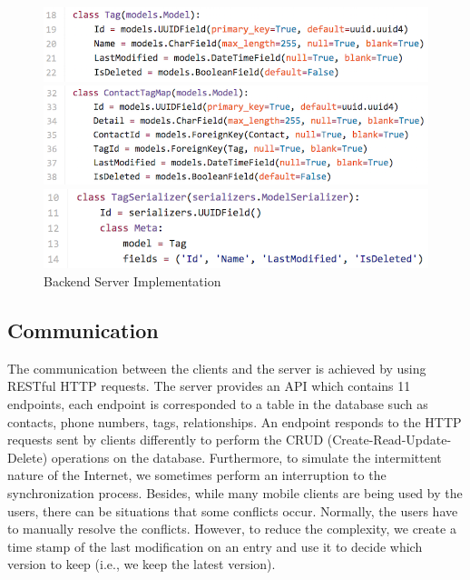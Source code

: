 \begin{figure}[!h]
\begin{centering}
\includegraphics[scale=0.5]{pics/django_tag.png}

\vspace{0.5cm}

\includegraphics[scale=0.5]{pics/django_tagmap.png}

\vspace{0.5cm}

\includegraphics[scale=0.46]{pics/django_serializer.png}
\caption{Backend Server Implementation}\label{fg:server_implementation}
\end{centering}
\end{figure}


\subsection{Communication}
The communication between the clients and the server is achieved by using RESTful HTTP requests. The server provides an API which contains 11 endpoints, each endpoint is corresponded to a table in the database such as contacts, phone numbers, tags, relationships. An endpoint responds to the HTTP requests sent by clients differently to perform the CRUD (Create-Read-Update-Delete) operations on the database. Furthermore, to simulate the intermittent nature of the Internet, we sometimes perform an interruption to the synchronization process. Besides, while many mobile clients are being used by the users, there can be situations that some conflicts occur. Normally, the users have to manually resolve the conflicts. However, to reduce the complexity, we create a time stamp of the last modification on an entry and use it to decide which version to keep (i.e., we keep the latest version).

